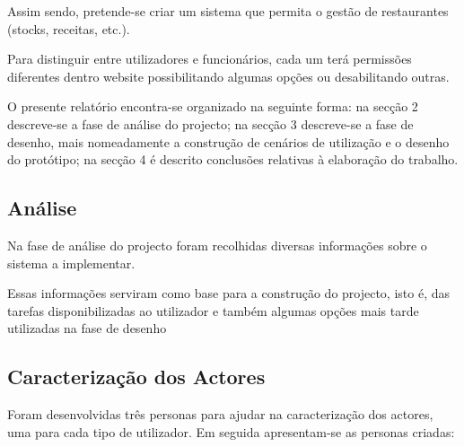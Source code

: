 Assim sendo, pretende-se criar um sistema que permita o gestão de restaurantes (stocks, receitas, etc.).

Para distinguir entre utilizadores e funcionários, cada um terá permissões diferentes dentro website possibilitando algumas opções ou desabilitando outras.

O presente relatório encontra-se organizado na seguinte forma: na secção 2 descreve-se a fase de análise do projecto; na secção 3 descreve-se a fase de desenho, mais nomeadamente a construção de cenários de utilização e o desenho do protótipo; na secção 4 é descrito conclusões relativas à elaboração do trabalho.

\subsection{Análise}

Na fase de análise do projecto foram recolhidas diversas informações sobre o sistema a implementar.

Essas informações serviram como base para a construção do projecto, isto é, das tarefas disponibilizadas ao utilizador e também algumas opções mais tarde utilizadas na fase de desenho

\subsection{Caracterização dos Actores}

Foram desenvolvidas três personas para ajudar na caracterização dos actores, uma para cada tipo de utilizador. Em seguida apresentam-se as personas criadas:


